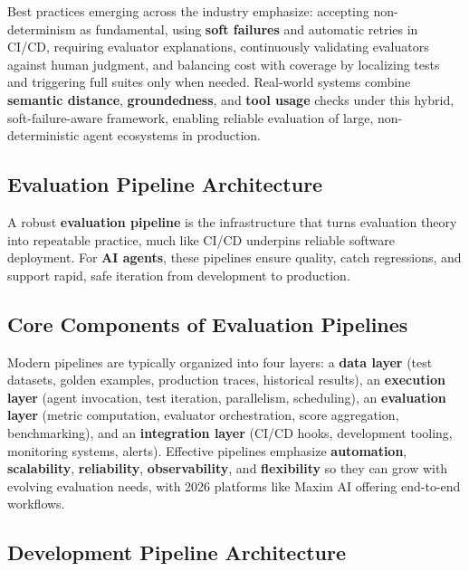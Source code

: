 \begin{TNtwocol}
Best practices emerging across the industry emphasize: accepting non-determinism as fundamental, using \textbf{soft failures} and automatic retries in CI/CD, requiring evaluator explanations, continuously validating evaluators against human judgment, and balancing cost with coverage by localizing tests and triggering full suites only when needed. Real-world systems combine \textbf{semantic distance}, \textbf{groundedness}, and \textbf{tool usage} checks under this hybrid, soft-failure-aware framework, enabling reliable evaluation of large, non-deterministic agent ecosystems in production.
​

\end{TNtwocol}
\begin{TNtwocol}
\section{Evaluation Pipeline Architecture}

A robust \textbf{evaluation pipeline} is the infrastructure that turns evaluation theory into repeatable practice, much like CI/CD underpins reliable software deployment. For \textbf{AI agents}, these pipelines ensure quality, catch regressions, and support rapid, safe iteration from development to production.

\subsection*{Core Components of Evaluation Pipelines}

Modern pipelines are typically organized into four layers: a \textbf{data layer} (test datasets, golden examples, production traces, historical results), an \textbf{execution layer} (agent invocation, test iteration, parallelism, scheduling), an \textbf{evaluation layer} (metric computation, evaluator orchestration, score aggregation, benchmarking), and an \textbf{integration layer} (CI/CD hooks, development tooling, monitoring systems, alerts). Effective pipelines emphasize \textbf{automation}, \textbf{scalability}, \textbf{reliability}, \textbf{observability}, and \textbf{flexibility} so they can grow with evolving evaluation needs, with 2026 platforms like Maxim AI offering end-to-end workflows.
​

\subsection*{Development Pipeline Architecture}


\end{TNtwocol}
